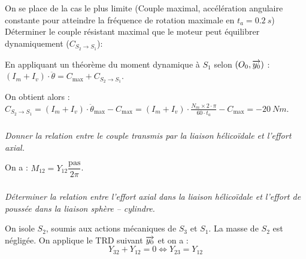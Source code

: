 \documentclass[10pt,fleqn]{article} %
\begin{document}
\begin{multicols}{2}
\begin{multicols}{2}
\begin{corrige}
On se place de la cas le plus limite (Couple maximal, accélération angulaire constante pour atteindre la fréquence de rotation maximale en $t_a=\SI{0,2}{s}$)
Déterminer le couple résistant maximal que le moteur peut équilibrer dynamiquement ($C_{S_2\to S_1}$):

En appliquant un théorème du moment dynamique à $S_1$ selon $\left(O_0,\overrightarrow{{y}_0}\right)$ :
$(I_m+I_v)\cdot \ddot{\theta}=C_{\text{max}}+C_{S_2\to S_1}$. 

On obtient alors : 
$C_{S_2\to S_1}=(I_m+I_v)\cdot \ddot{\theta}_{\text{max}}-C_{\text{max}}=(I_m+I_v)\cdot \frac{N_m\times 2\cdot \pi}{60\cdot t_a}-C_{\text{max}}=-\SI{20}{Nm}$.



\end{corrige}
\else
\fi


\subparagraph{}
\textit{Donner la relation entre le couple transmis par la liaison hélicoïdale et l'effort axial.}
\ifprof
\begin{corrige}
On a : $M_{12}=Y_{12}\dfrac{\text{pas}}{2\pi}$.
\end{corrige}
\else
\fi
\subparagraph{}
\textit{Déterminer la relation entre l'effort axial dans la liaison hélicoïdale et l'effort de poussée dans la liaison sphère -- cylindre.}
\ifprof
\begin{corrige}
On isole $S_2$, soumis aux actions mécaniques de $S_3$ et $S_1$. La masse de $S_2$ est négligée. 
On applique le TRD suivant $\overrightarrow{y_0}$ et on a : 
$$
Y_{32}+Y_{12}=0 \Leftrightarrow 
Y_{23}=Y_{12}
$$
\end{corrige}
\else
\fi



\end{multicols}
\end{multicols}
\end{document}
